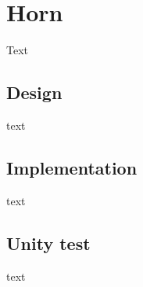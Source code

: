 \section{Horn}
Text

\subsection{Design}
text

\subsection{Implementation}
text

\subsection{Unity test}
text